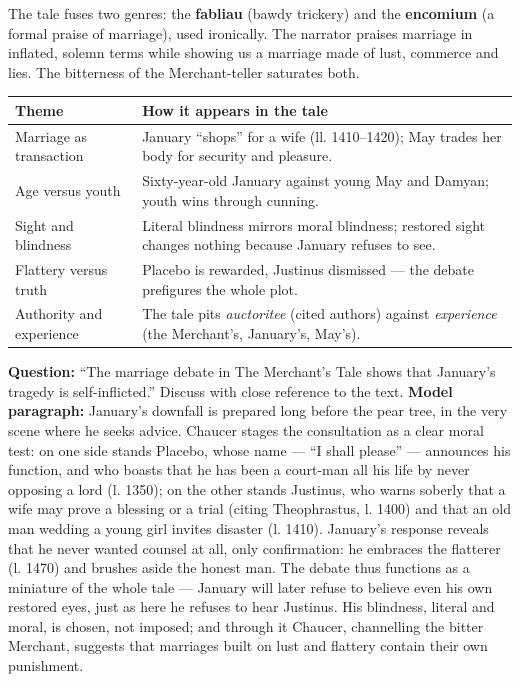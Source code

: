 \documentclass[11pt]{article}
\newcounter{popsec}
\newcounter{popsub}
\newcommand{\courssub}[1]{%
  \stepcounter{popsub}%
  \par\vspace{9pt}\noindent{\popxbold\fontsize{11.5}{13}\selectfont\color{popink}{\color{poporange}\thepopsec.\thepopsub}\hspace{6pt}#1}\par\nopagebreak\vspace{4pt}
}
\begin{document}
\courssub{Genre, Themes and Examination Practice}

The tale fuses two genres: the \textbf{fabliau} (bawdy trickery) and the \textbf{encomium} (a formal praise of marriage), used ironically. The narrator praises marriage in inflated, solemn terms while showing us a marriage made of lust, commerce and lies. The bitterness of the Merchant-teller saturates both.

\begin{center}
\begin{tabularx}{\linewidth}{|l|X|}
\hline
\rowcolor{popblueL} \textbf{Theme} & \textbf{How it appears in the tale} \\
\hline
Marriage as transaction & January ``shops'' for a wife (ll. 1410--1420); May trades her body for security and pleasure. \\
\hline
Age versus youth & Sixty-year-old January against young May and Damyan; youth wins through cunning. \\
\hline
Sight and blindness & Literal blindness mirrors moral blindness; restored sight changes nothing because January refuses to see. \\
\hline
Flattery versus truth & Placebo is rewarded, Justinus dismissed --- the debate prefigures the whole plot. \\
\hline
Authority and experience & The tale pits \emph{auctoritee} (cited authors) against \emph{experience} (the Merchant's, January's, May's). \\
\hline
\end{tabularx}
\end{center}

\begin{exoresolu}
\textbf{Question:} ``The marriage debate in The Merchant's Tale shows that January's tragedy is self-inflicted.'' Discuss with close reference to the text.
\tcblower
\textbf{Model paragraph:} January's downfall is prepared long before the pear tree, in the very scene where he seeks advice. Chaucer stages the consultation as a clear moral test: on one side stands Placebo, whose name --- ``I shall please'' --- announces his function, and who boasts that he has been a court-man all his life by never opposing a lord (l. 1350); on the other stands Justinus, who warns soberly that a wife may prove a blessing or a trial (citing Theophrastus, l. 1400) and that an old man wedding a young girl invites disaster (l. 1410). January's response reveals that he never wanted counsel at all, only confirmation: he embraces the flatterer (l. 1470) and brushes aside the honest man. The debate thus functions as a miniature of the whole tale --- January will later refuse to believe even his own restored eyes, just as here he refuses to hear Justinus. His blindness, literal and moral, is chosen, not imposed; and through it Chaucer, channelling the bitter Merchant, suggests that marriages built on lust and flattery contain their own punishment.
\end{exoresolu}
\end{document}
